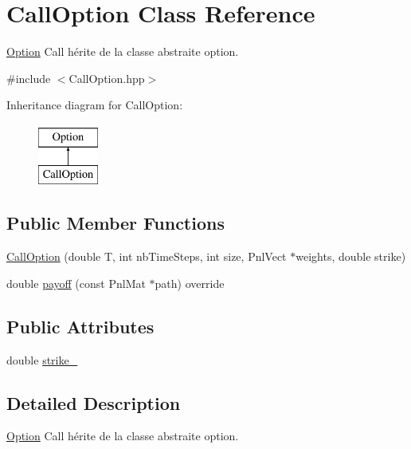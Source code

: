 \hypertarget{classCallOption}{\section{Call\-Option Class Reference}
\label{classCallOption}
}


\hyperlink{classOption}{Option} Call hérite de la classe abstraite option.  




{\ttfamily \#include $<$Call\-Option.\-hpp$>$}

Inheritance diagram for Call\-Option\-:\begin{figure}[H]
\begin{center}
\leavevmode
\includegraphics[height=2.000000cm]{classCallOption}
\end{center}
\end{figure}
\subsection*{Public Member Functions}
\begin{DoxyCompactItemize}
\item 
\hyperlink{classCallOption_a6a7af19aa666f2a24318dda2c232654c}{Call\-Option} (double T, int nb\-Time\-Steps, int size, Pnl\-Vect $\ast$weights, double strike)
\item 
double \hyperlink{classCallOption_add068157dca472105aede4a613970dfc}{payoff} (const Pnl\-Mat $\ast$path) override
\end{DoxyCompactItemize}
\subsection*{Public Attributes}
\begin{DoxyCompactItemize}
\item 
double \hyperlink{classCallOption_a5158e7f6be0b959b51e2e92172a49ebf}{strike\-\_\-}
\end{DoxyCompactItemize}


\subsection{Detailed Description}
\hyperlink{classOption}{Option} Call hérite de la classe abstraite option. 

